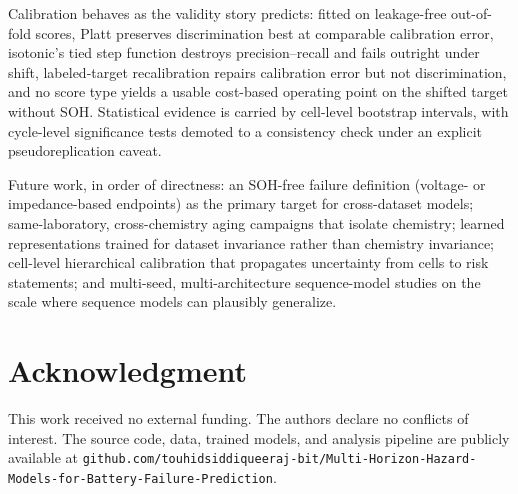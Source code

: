 \documentclass[IJPHM, 2014, 00]{PHMSociety}
\begin{document}
Calibration behaves as the validity story predicts: fitted on leakage-free out-of-fold scores, Platt preserves discrimination best at comparable calibration error, isotonic's tied step function destroys precision--recall and fails outright under shift, labeled-target recalibration repairs calibration error but not discrimination, and no score type yields a usable cost-based operating point on the shifted target without SOH. Statistical evidence is carried by cell-level bootstrap intervals, with cycle-level significance tests demoted to a consistency check under an explicit pseudoreplication caveat.

Future work, in order of directness: an SOH-free failure definition (voltage- or impedance-based endpoints) as the primary target for cross-dataset models; same-laboratory, cross-chemistry aging campaigns that isolate chemistry; learned representations trained for dataset invariance rather than chemistry invariance; cell-level hierarchical calibration that propagates uncertainty from cells to risk statements; and multi-seed, multi-architecture sequence-model studies on the scale where sequence models can plausibly generalize.

\section*{Acknowledgment}
This work received no external funding. The authors declare no conflicts of interest. The source code, data, trained models, and analysis pipeline are publicly available at \texttt{github.com/\allowbreak{}touhidsiddiqueeraj-bit/\allowbreak{}Multi-\allowbreak{}Horizon-\allowbreak{}Hazard-\allowbreak{}Models-\allowbreak{}for-\allowbreak{}Battery-\allowbreak{}Failure-\allowbreak{}Prediction}.

\raggedbottom






\end{document}

